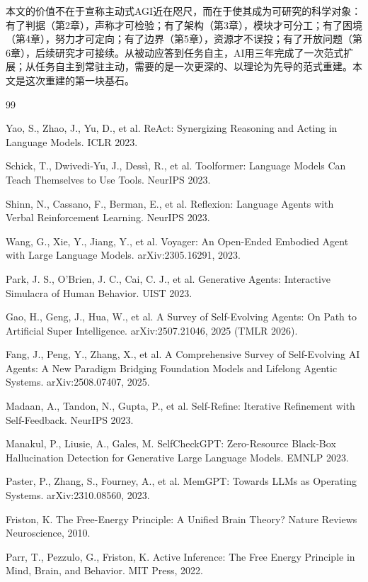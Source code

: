 \documentclass[11pt,a4paper]{ctexart}
\begin{document}
本文的价值不在于宣称主动式AGI近在咫尺，而在于使其成为可研究的科学对象：有了判据（第2章），声称才可检验；有了架构（第3章），模块才可分工；有了困境（第4章），努力才可定向；有了边界（第5章），资源才不误投；有了开放问题（第6章），后续研究才可接续。从被动应答到任务自主，AI用三年完成了一次范式扩展；从任务自主到常驻主动，需要的是一次更深的、以理论为先导的范式重建。本文是这次重建的第一块基石。

\begin{thebibliography}{99}

 Yao, S., Zhao, J., Yu, D., et al. ReAct: Synergizing Reasoning and Acting in Language Models. ICLR 2023.

 Schick, T., Dwivedi-Yu, J., Dessì, R., et al. Toolformer: Language Models Can Teach Themselves to Use Tools. NeurIPS 2023.

 Shinn, N., Cassano, F., Berman, E., et al. Reflexion: Language Agents with Verbal Reinforcement Learning. NeurIPS 2023.

 Wang, G., Xie, Y., Jiang, Y., et al. Voyager: An Open-Ended Embodied Agent with Large Language Models. arXiv:2305.16291, 2023.

 Park, J. S., O'Brien, J. C., Cai, C. J., et al. Generative Agents: Interactive Simulacra of Human Behavior. UIST 2023.

 Gao, H., Geng, J., Hua, W., et al. A Survey of Self-Evolving Agents: On Path to Artificial Super Intelligence. arXiv:2507.21046, 2025 (TMLR 2026).

 Fang, J., Peng, Y., Zhang, X., et al. A Comprehensive Survey of Self-Evolving AI Agents: A New Paradigm Bridging Foundation Models and Lifelong Agentic Systems. arXiv:2508.07407, 2025.

 Madaan, A., Tandon, N., Gupta, P., et al. Self-Refine: Iterative Refinement with Self-Feedback. NeurIPS 2023.

 Manakul, P., Liusie, A., Gales, M. SelfCheckGPT: Zero-Resource Black-Box Hallucination Detection for Generative Large Language Models. EMNLP 2023.

 Paster, P., Zhang, S., Fourney, A., et al. MemGPT: Towards LLMs as Operating Systems. arXiv:2310.08560, 2023.

 Friston, K. The Free-Energy Principle: A Unified Brain Theory? Nature Reviews Neuroscience, 2010.

 Parr, T., Pezzulo, G., Friston, K. Active Inference: The Free Energy Principle in Mind, Brain, and Behavior. MIT Press, 2022.


\end{thebibliography}
\end{document}
